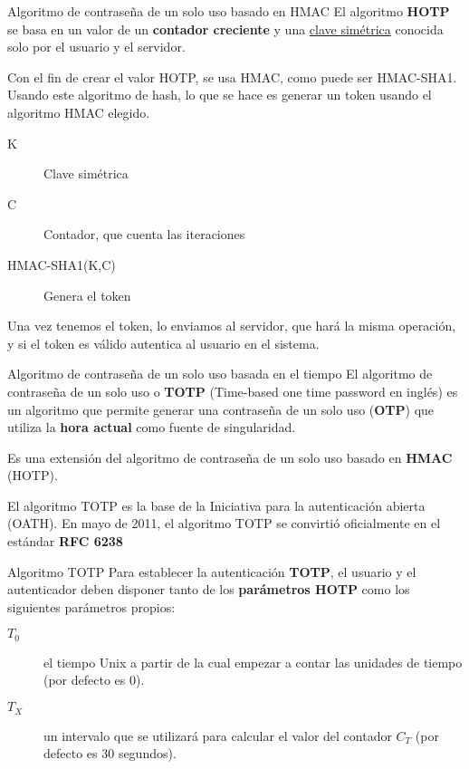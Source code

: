 \begin{frame}[c]{Algoritmo de contraseña de un solo uso basado en HMAC}
  El algoritmo \textbf{HOTP} se basa en un valor de un \textbf{contador
  creciente} y una \underline{clave simétrica} conocida solo por el
  usuario y el servidor.

  \vspace{\baselineskip}
  Con el fin de crear el valor HOTP, se usa HMAC, como puede ser HMAC-SHA1.
  Usando este algoritmo de hash, lo que se hace es generar un token usando
  el algoritmo HMAC elegido.

  \begin{description}
    \item[K] Clave simétrica
    \item[C] Contador, que cuenta las iteraciones
    \item[HMAC-SHA1(K,C)] Genera el token
  \end{description}

  \vspace{\baselineskip}
  Una vez tenemos el token, lo enviamos al servidor, que hará la misma
  operación, y si el token es válido autentica al usuario en el sistema.
\end{frame}

\begin{frame}[c]{Algoritmo de contraseña de un solo uso basada en el tiempo}
  El algoritmo de contraseña de un solo uso o \textbf{TOTP} (Time-based one
  time password en inglés) es un algoritmo que permite generar una contraseña
  de un solo uso (\textbf{OTP}) que utiliza la \textbf{hora actual}
  como fuente de singularidad.

  \vspace{\baselineskip}
  Es una extensión del algoritmo de contraseña de un solo uso basado en
  \textbf{HMAC} (HOTP).

  \vspace{\baselineskip}
  El algoritmo TOTP es la base de la Iniciativa para la
  autenticación abierta (OATH).
  En mayo de 2011, el algoritmo TOTP se convirtió oficialmente en
  el estándar \textbf{RFC 6238}
\end{frame}

\begin{frame}[c]{Algoritmo TOTP}
  Para establecer la autenticación \textbf{TOTP}, el usuario y el
  autenticador deben disponer tanto de los \textbf{parámetros HOTP}
  como los siguientes parámetros propios:

  \begin{description}
    \item [$T_0$] el tiempo Unix a partir de la cual empezar a contar
      las unidades de tiempo (por defecto es $0$).
    \item [$T_X$] un intervalo que se utilizará para calcular el valor
      del contador $C_T$ (por defecto es 30 segundos).
  \end{description}
\end{frame}

